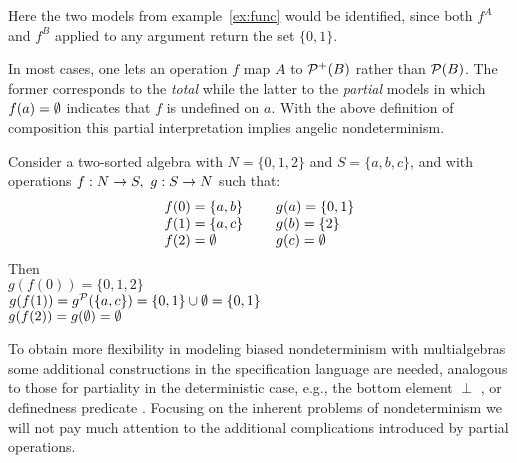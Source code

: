 Here the two models from example~\ref{ex:func}
would be identified, since both $f^{A}$ and $f^{B}$
applied to any argument return the set $\{0,1\}$. 

In most cases, one lets an operation $f$ 
map $A$ to ${\cal P}^{+}(B)$ rather than ${\cal P}(B)$. The former 
corresponds to the {\em total} while the latter to the {\em partial} 
models in which $f(a)=\emptyset$ indicates that $f$ is undefined on $a$. 
With the above definition of 
composition this partial interpretation implies angelic 
nondeterminism.

\begin{Example}\label{ex:angelic} 
Consider a two-sorted algebra with
 $N = \{0,1,2\}$ and $S=\{a,b,c\}$, and with operations 
$f:N\mathrel{\rightarrow} S,\ g:S\mathrel{\rightarrow} N$  such that:
\[ \begin{array}{l@{\ \ \ \ \ \ \ }l}
f(0) = \{a,b\} & g(a) = \{0,1\} \\ 
f(1) = \{a,c\} & g(b) = \{2\} \\ 
f(2) = \es  & g(c) = \es \end{array}
\]
Then \\
\hspace*{2em}$ g(f(0)) = \{0,1,2\} $ \\
\hspace*{2em}$ g(f(1)) = g^{{\cal P}}(\{a,c\}) = \{0,1\}\cup \emptyset = \{0,1\} $ \\
\hspace*{2em}$ g(f(2)) = g(\emptyset) = \emptyset $ 
\end{Example}

To obtain more flexibility in modeling biased 
nondeterminism with multialgebras some additional constructions in 
the specification language are needed, analogous to those for partiality in the deterministic case, 
e.g., the bottom element $\perp$ \cite{c:77, c:63, c:91}, or definedness 
predicate \cite{c:21, c:18, c:59, c:58}.
Focusing on the inherent problems of nondeterminism we will
not pay much attention to the additional complications introduced by
partial operations. 

